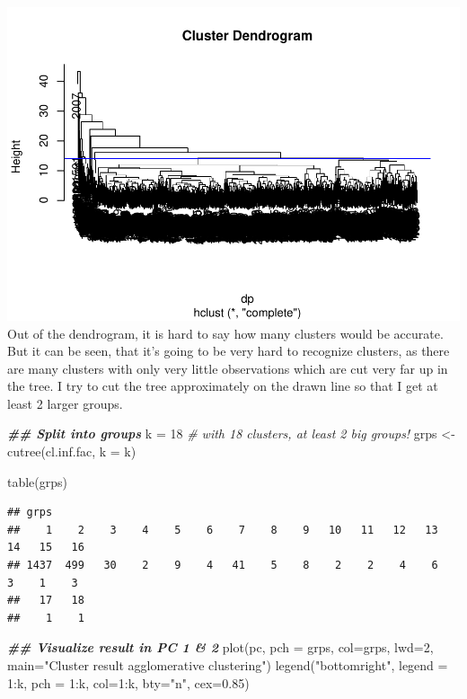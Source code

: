 \documentclass[
]{article}
\newenvironment{Shaded}{\begin{snugshade}}{\end{snugshade}}
\newcommand{\AttributeTok}[1]{\textcolor[rgb]{0.77,0.63,0.00}{#1}}
\newcommand{\CommentTok}[1]{\textcolor[rgb]{0.56,0.35,0.01}{\textit{#1}}}
\newcommand{\DecValTok}[1]{\textcolor[rgb]{0.00,0.00,0.81}{#1}}
\newcommand{\DocumentationTok}[1]{\textcolor[rgb]{0.56,0.35,0.01}{\textbf{\textit{#1}}}}
\newcommand{\FloatTok}[1]{\textcolor[rgb]{0.00,0.00,0.81}{#1}}
\newcommand{\FunctionTok}[1]{\textcolor[rgb]{0.00,0.00,0.00}{#1}}
\newcommand{\NormalTok}[1]{#1}
\newcommand{\OtherTok}[1]{\textcolor[rgb]{0.56,0.35,0.01}{#1}}
\newcommand{\SpecialCharTok}[1]{\textcolor[rgb]{0.00,0.00,0.00}{#1}}
\newcommand{\StringTok}[1]{\textcolor[rgb]{0.31,0.60,0.02}{#1}}
\begin{document}
\includegraphics{Influence_factors_files/figure-latex/3.02_aggloclust_munic-1.pdf}
Out of the dendrogram, it is hard to say how many clusters would be
accurate. But it can be seen, that it's going to be very hard to
recognize clusters, as there are many clusters with only very little
observations which are cut very far up in the tree. I try to cut the
tree approximately on the drawn line so that I get at least 2 larger
groups.

\begin{Shaded}
\begin{Highlighting}[]
\DocumentationTok{\#\# Split into groups}
\NormalTok{k }\OtherTok{=} \DecValTok{18} \CommentTok{\# with 18 clusters, at least 2 big groups!}
\NormalTok{grps }\OtherTok{\textless{}{-}} \FunctionTok{cutree}\NormalTok{(cl.inf.fac, }\AttributeTok{k =}\NormalTok{ k) }

\FunctionTok{table}\NormalTok{(grps)}
\end{Highlighting}
\end{Shaded}

\begin{verbatim}
## grps
##    1    2    3    4    5    6    7    8    9   10   11   12   13   14   15   16 
## 1437  499   30    2    9    4   41    5    8    2    2    4    6    3    1    3 
##   17   18 
##    1    1
\end{verbatim}

\begin{Shaded}
\begin{Highlighting}[]
\DocumentationTok{\#\# Visualize result in PC 1 \& 2}
\FunctionTok{plot}\NormalTok{(pc, }\AttributeTok{pch =}\NormalTok{ grps, }\AttributeTok{col=}\NormalTok{grps, }\AttributeTok{lwd=}\DecValTok{2}\NormalTok{, }\AttributeTok{main=}\StringTok{"Cluster result agglomerative clustering"}\NormalTok{) }
\FunctionTok{legend}\NormalTok{(}\StringTok{"bottomright"}\NormalTok{, }\AttributeTok{legend =} \DecValTok{1}\SpecialCharTok{:}\NormalTok{k, }\AttributeTok{pch =} \DecValTok{1}\SpecialCharTok{:}\NormalTok{k, }\AttributeTok{col=}\DecValTok{1}\SpecialCharTok{:}\NormalTok{k, }\AttributeTok{bty=}\StringTok{"n"}\NormalTok{, }\AttributeTok{cex=}\FloatTok{0.85}\NormalTok{)}
\end{Highlighting}
\end{Shaded}
\end{document}
